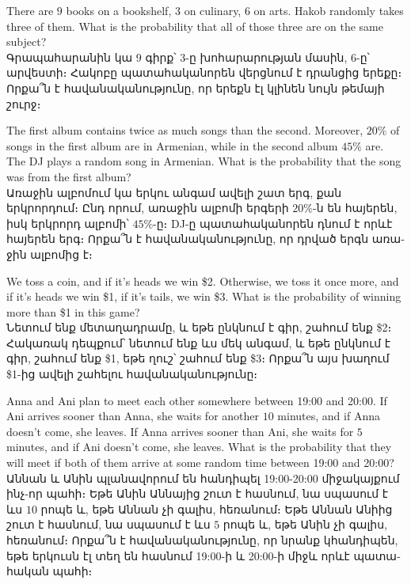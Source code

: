 \begin{problem}
There are $9$ books on a bookshelf, $3$ on culinary, $6$ on arts. Hakob randomly takes three of them. What is the probability that all of those three are on the same subject?
\\
\textarmenian{Գրապահարանին կա $9$ գիրք՝ $3$-ը խոհարարության մասին, $6$-ը՝ արվեստի։ Հակոբը պատահականորեն վերցնում է դրանցից երեքը։ Որքա՞ն է հավանականությունը, որ երեքն էլ կլինեն նույն թեմայի շուրջ։}
\end{problem}
\medskip

\begin{problem}
The first album contains twice as much songs than the second. Moreover, $20\%$ of songs in the first album are in Armenian, while in the second album $45\%$ are. The DJ plays a random song in Armenian. What is the probability that the song was from the first album?
\\
\textarmenian{Առաջին ալբոմում կա երկու անգամ ավելի շատ երգ, քան երկրորդում։ Ընդ որում, առաջին ալբոմի երգերի $20\%$-ն են հայերեն, իսկ երկրորդ ալբոմի՝ $45\%$-ը։ {\rm DJ}-ը պատահականորեն դնում է որևէ հայերեն երգ։ Որքա՞ն է հավանականությունը, որ դրված երգն առաջին ալբոմից է։}
\end{problem}
\medskip


\begin{problem}
We toss a coin, and if it's heads we win \$2. Otherwise, we toss it once more, and if it's heads we win \$1, if it's tails, we win \$3. What is the probability of winning more than \$1 in this game?
\\
\textarmenian{Նետում ենք մետաղադրամը, և եթե ընկնում է գիր, շահում ենք \$2։ Հակառակ դեպքում՝ նետում ենք ևս մեկ անգամ, և եթե ընկնում է գիր, շահում ենք \$1, եթե ղուշ՝ շահում ենք \$3։ Որքա՞ն այս խաղում \$1-ից ավելի շահելու հավանականությունը։}
\end{problem}
\medskip



\begin{problem}
Anna and Ani plan to meet each other somewhere between 19:00 and 20:00. If Ani arrives sooner than Anna, she waits for another $10$ minutes, and if Anna doesn't come, she leaves. If Anna arrives sooner than Ani, she waits for $5$ minutes, and if Ani doesn't come, she leaves. What is the probability that they will meet if both of them arrive at some random time between 19:00 and 20:00?
\\
\textarmenian{Աննան և Անին պլանավորում են հանդիպել 19:00-20:00 միջակայքում ինչ-որ պահի։ Եթե Անին Աննայից շուտ է հասնում, նա սպասում է ևս $10$ րոպե և, եթե Աննան չի գալիս, հեռանում։ Եթե Աննան Անիից շուտ է հասնում, նա սպասում է ևս $5$ րոպե և, եթե Անին չի գալիս, հեռանում։ Որքա՞ն է հավանականությունը, որ նրանք կհանդիպեն, եթե երկուսն էլ տեղ են հասնում 19:00-ի և 20:00-ի միջև որևէ պատահական պահի։}
\end{problem}
\medskip

